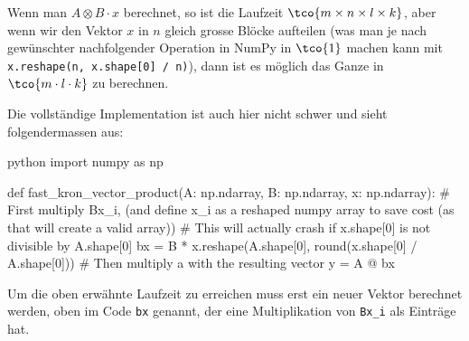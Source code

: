  Wenn man $A \otimes B \cdot x$ berechnet, so ist die Laufzeit $\tco{m \times n \times l \times k}$, aber wenn wir den Vektor $x$ in $n$ gleich grosse Blöcke aufteilen (was man je nach gewünschter nachfolgender Operation in NumPy in $\tco{1}$ machen kann mit \verb|x.reshape(n, x.shape[0] / n)|), dann ist es möglich das Ganze in $\tco{m \cdot l \cdot k}$ zu berechnen. 

Die vollständige Implementation ist auch hier nicht schwer und sieht folgendermassen aus:
\begin{code}{python}
import numpy as np

def fast_kron_vector_product(A: np.ndarray, B: np.ndarray, x: np.ndarray):
    # First multiply Bx_i, (and define x_i as a reshaped numpy array to save cost (as that will create a valid array))
    # This will actually crash if x.shape[0] is not divisible by A.shape[0]
    bx = B * x.reshape(A.shape[0], round(x.shape[0] / A.shape[0]))
    # Then multiply a with the resulting vector
    y = A @ bx
\end{code}

Um die oben erwähnte Laufzeit zu erreichen muss erst ein neuer Vektor berechnet werden, oben im Code \verb|bx| genannt, der eine Multiplikation von \verb|Bx_i| als Einträge hat.
